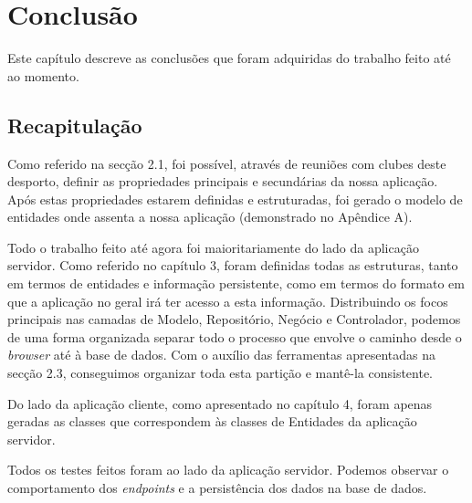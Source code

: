 %
%
\chapter{Conclusão} \label{conclusao}
Este capítulo descreve as conclusões que foram adquiridas do trabalho feito até ao momento.

\section{Recapitulação}\label{sec61}
Como referido na secção 2.1, foi possível, através de reuniões com clubes deste desporto, definir as propriedades principais e secundárias da nossa aplicação. Após estas propriedades estarem definidas e estruturadas, foi gerado o modelo de entidades onde assenta a nossa aplicação (demonstrado no Apêndice A).

Todo o trabalho feito até agora foi maioritariamente do lado da aplicação servidor. Como referido no capítulo 3, foram definidas todas as estruturas, tanto em termos de entidades e informação persistente, como em termos do formato em que a aplicação no geral irá ter acesso a esta informação. Distribuindo os focos principais nas camadas de Modelo, Repositório, Negócio e Controlador, podemos de uma forma organizada separar todo o processo que envolve o caminho desde o \emph{browser} até à base de dados. Com o auxílio das ferramentas apresentadas na secção 2.3, conseguimos organizar toda esta partição e mantê-la consistente. 

Do lado da aplicação cliente, como apresentado no capítulo 4, foram apenas geradas as classes que correspondem às classes de Entidades da aplicação servidor.

Todos os testes feitos foram ao lado da aplicação servidor. Podemos observar o comportamento dos \emph{endpoints} e a persistência dos dados na base de dados.
